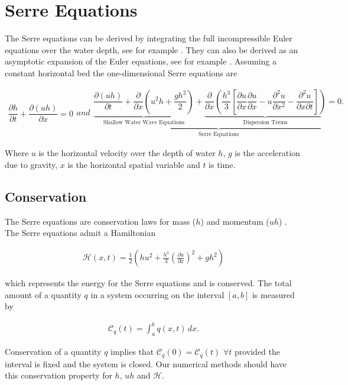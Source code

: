 \documentclass[times]{elsarticle}
\begin{document}
\section{Serre Equations}
\label{section:Serre Equations}
The Serre equations can be derived by integrating the full incompressible Euler equations over the water depth, see for example \cite{Su-Gardener-1969-536}. They can also be derived as an asymptotic expansion of the Euler equations, see for example \cite{Bonneton-Lannes-2009-16601}. Assuming a constant horizontal bed the one-dimensional Serre equations are \cite{Guyenne-etal-2014-169}
\begin{linenomath*}
\begin{subequations}\label{eq:Serre_nonconservative_form}
\begin{gather}
\dfrac{\partial h}{\partial t} + \dfrac{\partial (uh)}{\partial x} = 0
\label{eq:Serre_continuity}
\end{gather}
and
\begin{gather}
\underbrace{\underbrace{\dfrac{\partial (uh)}{\partial t} + \dfrac{\partial}{\partial x} \left ( u^2h + \dfrac{gh^2}{2}\right )}_{\text{Shallow Water Wave Equations}} + \underbrace{\dfrac{\partial}{\partial x} \left (  \dfrac{h^3}{3} \left [ \dfrac{\partial u }{\partial x} \dfrac{\partial u}{\partial x} - u\dfrac{\partial^2 u}{\partial x^2}  - \dfrac{\partial^2 u}{\partial x \partial t}\right ] \right )}_{\text{Dispersion Terms}} = 0.}_{\text{Serre Equations}}
\label{eq:Serre_momentum}
\end{gather}
\end{subequations}
\end{linenomath*}
Where $u$ is the  horizontal velocity over the depth of water $h$, $g$ is the acceleration due to gravity, $x$ is the horizontal spatial variable and $t$ is time. 

\subsection{Conservation}
The Serre equations are conservation laws for mass ($h$) and momentum ($uh$) \cite{Su-Gardener-1969-536}. The Serre equations admit a Hamiltonian \cite{Li-Y-2002,Green-Naghdi-1976-237}
\begin{linenomath*}
	\begin{gather}
	\label{eqn:Hamildef}
	\mathcal{H}(x,t) = \frac{1}{2} \left(hu^2 + \frac{h^3}{3} \left(\frac{\partial u}{\partial x}\right)^2 + gh^2\right)
	\end{gather}
\end{linenomath*}
which represents the energy for the Serre equations and is conserved. The total amount of a quantity $q$ in a system occurring on the interval $[a,b]$ is measured by
\begin{linenomath*}
\begin{gather*}
\label{eqn:Condef}
\mathcal{C}_q(t) = \int_{a}^{b} q(x,t)\, dx .
\end{gather*}
\end{linenomath*}
Conservation of a quantity $q$ implies that $\mathcal{C}_{q}(0) = \mathcal{C}_{q}(t)$ $\forall t$ provided the interval is fixed and the system is closed. Our numerical methods should have this conservation property for $h$, $uh$ and $\mathcal{H}$.  
\end{document}

